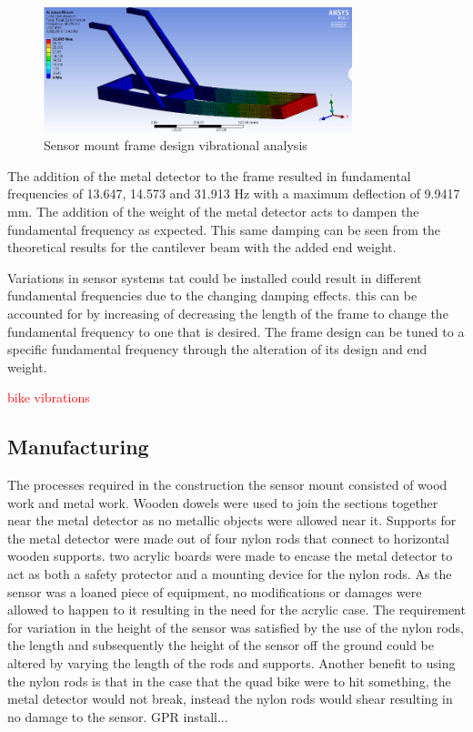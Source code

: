 \documentclass[main.tex]{subfiles}
\begin{document}
\begin{figure}[ht]
\includegraphics[width=0.8\textwidth]{4-DetailedDesign/frameANSYS.PNG}
\centering
\caption{Sensor mount frame design vibrational analysis} 
\end{figure} 

The addition of the metal detector to the frame resulted in fundamental frequencies of 13.647, 14.573 and 31.913 Hz with a maximum deflection of 9.9417 mm. The addition of the weight of the metal detector acts to dampen the fundamental frequency as expected. This same damping can be seen from the theoretical results for the cantilever beam with the added end weight.

Variations in sensor systems tat could be installed could result in different fundamental frequencies due to the changing damping effects. this can be accounted for by increasing of decreasing the length of the frame to change the fundamental frequency to one that is desired. The frame design can be tuned to a specific fundamental frequency through the alteration of its design and end weight. 

\textcolor{red}{bike vibrations}  

\subsection{Manufacturing}
The processes required in the construction the sensor mount consisted of wood work and metal work. Wooden dowels were used to join the sections together near the metal detector as no metallic objects were allowed near it. Supports for the metal detector were made out of four nylon rods that connect to horizontal wooden supports. two acrylic boards were made to encase the metal detector to act as both a safety protector and a mounting device for the nylon rods. As the sensor was a loaned piece of equipment, no modifications or damages were allowed to happen to it resulting in the need for the acrylic case. The requirement for variation in the height of the sensor was satisfied by the use of the nylon rods, the length and subsequently the height of the sensor off the ground could be altered by varying the length of the rods and supports. Another benefit to using the nylon rods is that in the case that the quad bike were to hit something, the metal detector would not break, instead the nylon rods would shear resulting in no damage to the sensor.
GPR install...
\end{document}
